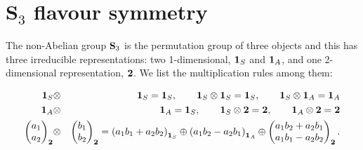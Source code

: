 \documentclass[aps,prd,groupaddress,floatfix,tighten,nofootinbib,showpacs,amsfonts,superscriptaddress]{revtex4-2}
\begin{document}
 




\appendix
\section{$\mathbf{S}_{3}$ flavour symmetry}
The non-Abelian group ${\bf S}_{3}$ is the permutation group of three objects \cite{Ishimori:2010au} and this has three irreducible representations: two 1-dimensional, ${\bf 1}_{S}$ and ${\bf 1}_{A}$, and one 2-dimensional representation, ${\bf 2}$. We list the multiplication rules among them:

\begin{eqnarray}\label{rules}
{\bf 1}_{S}&\otimes& {\bf 1}_{S}={\bf 1}_{S}, \qquad {\bf 1}_{S}\otimes {\bf 1}_{S}={\bf 1}_{S},\qquad {\bf 1}_{S}\otimes {\bf 1}_{A}={\bf 1}_{A}\nonumber\\
{\bf 1}_{A}&\otimes& {\bf 1}_{A}={\bf 1}_{S},\qquad {\bf 1}_{S}\otimes {\bf 2}={\bf 2},\qquad {\bf 1}_{A}\otimes {\bf 2}={\bf 2}\nonumber\\
\begin{pmatrix}
a_{1} \\ 
a_{2}
\end{pmatrix}_{{\bf 2}}
&\otimes&
\begin{pmatrix}
b_{1} \\ 
b_{2}
\end{pmatrix}_{{\bf 2}}=
\left(a_{1}b_{1}+a_{2}b_{2}\right)_{{\bf 1}_{S}} \oplus  \left(a_{1}b_{2}-a_{2}b_{1}\right)_{{\bf 1}_{A}} \oplus	
\begin{pmatrix}
a_{1}b_{2}+a_{2}b_{1} \\ 
a_{1}b_{1}-a_{2}b_{2}
\end{pmatrix}_{{\bf 2}}. 
\end{eqnarray}






\end{document}

